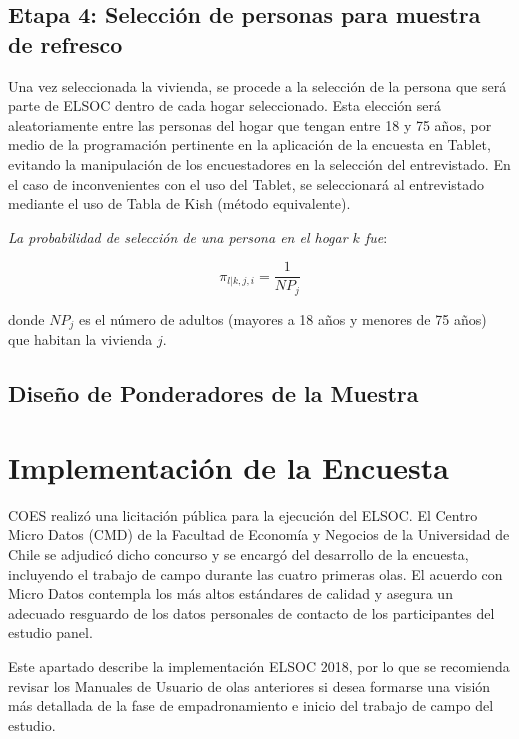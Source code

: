 \documentclass[
  openany]{book}
\begin{document}
\hypertarget{etapa-4-selecciuxf3n-de-personas-para-muestra-de-refresco}{%
\section{Etapa 4: Selección de personas para muestra de refresco}\label{etapa-4-selecciuxf3n-de-personas-para-muestra-de-refresco}}

Una vez seleccionada la vivienda, se procede a la selección de la persona que será parte de ELSOC dentro de cada hogar seleccionado. Esta elección será aleatoriamente entre las personas del hogar que tengan entre 18 y 75 años, por medio de la programación pertinente en la aplicación de la encuesta en Tablet, evitando la manipulación de los encuestadores en la selección del entrevistado. En el caso de inconvenientes con el uso del Tablet, se seleccionará al entrevistado mediante el uso de Tabla de Kish (método equivalente).

\emph{La probabilidad de selección de una persona en el hogar \(k\) fue}:

\[\pi_{l|k,j,i}=\frac{1}{NP_j}\]

donde \(NP_j\) es el número de adultos (mayores a 18 años y menores de 75 años) que habitan la vivienda \(j\).

\hypertarget{diseuxf1o-de-ponderadores-de-la-muestra}{%
\section{Diseño de Ponderadores de la Muestra}\label{diseuxf1o-de-ponderadores-de-la-muestra}}

\hypertarget{implement_encuesta}{%
\chapter{Implementación de la Encuesta}\label{implement_encuesta}}

COES realizó una licitación pública para la ejecución del ELSOC. El Centro Micro Datos (CMD) de la Facultad de Economía y Negocios de la Universidad de Chile se adjudicó dicho concurso y se encargó del desarrollo de la encuesta, incluyendo el trabajo de campo durante las cuatro primeras olas. El acuerdo con Micro Datos contempla los más altos estándares de calidad y asegura un adecuado resguardo de los datos personales de contacto de los participantes del estudio panel.

Este apartado describe la implementación ELSOC 2018, por lo que se recomienda revisar los Manuales de Usuario de olas anteriores si desea formarse una visión más detallada de la fase de empadronamiento e inicio del trabajo de campo del estudio.
\end{document}
